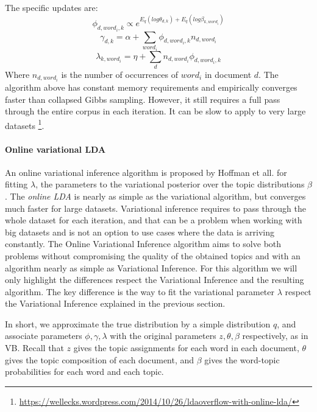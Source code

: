 \documentclass[12pt]{report}
\begin{document}
The specific updates are:
\begin{equation}
\phi_{d,word_{i},k} \propto e^{E_{q}(log \theta_{d,k})+E_{q}(log\beta_{k,word_{i}})}
\end{equation}
\begin{equation}
\gamma_{d,k} = \alpha + \sum_{word_{i}}\phi_{d,word_{i},k}n_{d,word_{i}}
\end{equation}
\begin{equation}
\lambda_{k,word_{i}}=\eta +\sum_{d}n_{d,word_{i}}\phi_{d,word_{i},k}
\end{equation}
Where $n_{d,word_{i}}$ is the number of occurrences of $word_{i}$ in
document $d$. The algorithm above has constant memory requirements and
empirically converges faster than collapsed Gibbs sampling. However,
it still requires a full pass through the entire corpus in each
iteration. It can be slow to apply to very large datasets
\footnote{\url{https://wellecks.wordpress.com/2014/10/26/ldaoverflow-with-online-lda/}}.

\paragraph{Online variational LDA}
\label{oLDAvb}
An online variational inference algorithm is proposed by Hoffman et all.\cite{onlineLDAvb} for fitting $\lambda$, the parameters to the variational
posterior over the topic distributions $\beta$. The \emph{online LDA} is nearly as
simple as the variational algorithm, but converges much faster for large
datasets. Variational inference requires to pass through the whole dataset for
each iteration, and that can be a problem when working with big datasets and is
not an option to use cases where the data is arriving constantly. The Online
Variational Inference algorithm aims to solve both problems without compromising
the quality of the obtained topics and with an algorithm nearly as simple as
Variational Inference. For this algorithm we will only highlight the differences
respect the Variational Inference and the resulting algorithm. The key
difference is the way to fit the variational parameter $\lambda$ respect the
Variational Inference explained in the previous section.

In short, we approximate the true distribution by a simple distribution $q$, and
associate parameters $\phi,\gamma,\lambda$ with the original parameters $z,\theta,
\beta$ respectively, as in VB. Recall that $z$ gives the topic assignments for each
word in each document, $\theta$ gives the topic composition of each document, 
and $\beta$ gives the word-topic probabilities for each word and each topic.
\end{document}
